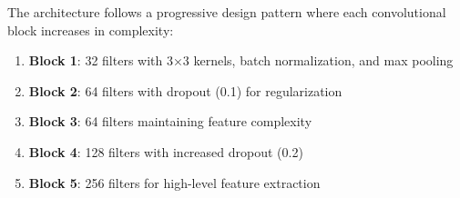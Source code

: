 \documentclass[conference]{IEEEtran}
\begin{document}
The architecture follows a progressive design pattern where each convolutional block increases in complexity:
\begin{enumerate}
    \item \textbf{Block 1}: 32 filters with 3×3 kernels, batch normalization, and max pooling
    \item \textbf{Block 2}: 64 filters with dropout (0.1) for regularization
    \item \textbf{Block 3}: 64 filters maintaining feature complexity
    \item \textbf{Block 4}: 128 filters with increased dropout (0.2)
    \item \textbf{Block 5}: 256 filters for high-level feature extraction
\end{enumerate}

\end{document}
